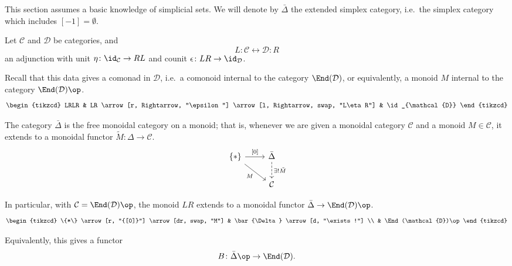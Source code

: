 \documentclass[main.tex]{subfiles}
\begin{document}
This section assumes a basic knowledge of simplicial sets. We will denote by $\bar{\Delta}$ the extended simplex category, i.e.\ the simplex category which includes $[-1] = \emptyset$.

Let $\mathcal{C}$ and $\mathcal{D}$ be categories, and
\begin{equation*}
  L : \mathcal{C} \leftrightarrow \mathcal{D} : R
\end{equation*}
an adjunction with unit $\eta\colon \id_{\mathcal{C}} \to RL$ and counit $\epsilon\colon LR \to \id_{\mathcal{D}}$.

Recall that this data gives a comonad in $\mathcal{D}$, i.e.\ a comonoid internal to the category $\End(\mathcal{D})$, or equivalently, a monoid $M$ internal to the category $\End(\mathcal{D})\op$.
\begin{equation*}
  \begin{tikzcd}
    LRLR
    & LR
    \arrow[r, Rightarrow, "\epsilon"]
    \arrow[l, Rightarrow, swap, "L\eta R"]
    & \id_{\mathcal{D}}
  \end{tikzcd}
\end{equation*}

The category $\bar{\Delta}$ is the free monoidal category on a monoid; that is, whenever we are given a monoidal category $\mathcal{C}$ and a monoid $M \in \mathcal{C}$, it extends to a monoidal functor $\tilde{M}\colon \Delta \to \mathcal{C}$.
\begin{equation*}
  \begin{tikzcd}
    \{*\}
    \arrow[r, "{[0]}"]
    \arrow[dr, swap, "M"]
    & \bar{\Delta}
    \arrow[d, dashed, "\exists! \tilde{M}"]
    \\
    & \mathcal{C}
  \end{tikzcd}
\end{equation*}

In particular, with $\mathcal{C} = \End(\mathcal{D})\op$, the monoid $LR$ extends to a monoidal functor $\bar{\Delta} \to \End(\mathcal{D})\op$.
\begin{equation*}
  \begin{tikzcd}
    \{*\}
    \arrow[r, "{[0]}"]
    \arrow[dr, swap, "M"]
    & \bar{\Delta}
    \arrow[d, "\exists!"]
    \\
    & \End(\mathcal{D})\op
  \end{tikzcd}
\end{equation*}

Equivalently, this gives a functor
\begin{equation*}
  B\colon \bar{\Delta}\op \to \End(\mathcal{D}).
\end{equation*}
\end{document}

